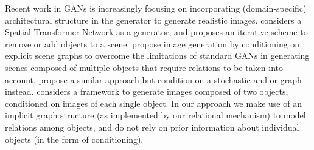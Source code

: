\documentclass{article}
\begin{document}
Recent work in GANs is increasingly focusing on incorporating (domain-specific) architectural structure in the generator to generate realistic images.
\cite{lin2018st} considers a Spatial Transformer Network as a generator, and proposes an iterative scheme to remove or add objects to a scene.
\cite{johnson2018image} propose image generation by conditioning on explicit scene graphs to overcome the limitations of standard GANs in generating scenes composed of multiple objects that require relations to be taken into account.
\cite{xu2018deep} propose a similar approach but condition on a stochastic and-or graph instead.
\cite{azadi2018compositional} considers a framework to generate images composed of two objects, conditioned on images of each single object.
In our approach we make use of an implicit graph structure (as implemented by our relational mechanism) to model relations among objects, and do not rely on prior information about individual objects (in the form of conditioning).

\end{document}
